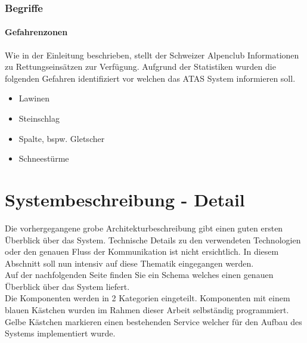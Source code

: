 \documentclass[11pt,english,german]{report}
\theoremstyle{definition}
\begin{document}
\subsection{Begriffe}
\subsubsection{Gefahrenzonen}
Wie in der Einleitung beschrieben, stellt der Schweizer Alpenclub Informationen zu Rettungseinsätzen zur Verfügung. Aufgrund der Statistiken wurden die folgenden Gefahren identifiziert vor welchen das ATAS System informieren soll.
\begin{itemize}
	\item Lawinen
	\item Steinschlag
	\item Spalte, bspw. Gletscher
	\item Schneestürme
\end{itemize}

\newpage
\chapter{Systembeschreibung - Detail}
Die vorhergegangene grobe Architekturbeschreibung gibt einen guten ersten Überblick über das System. Technische Details zu  den verwendeten Technologien oder den genauen Fluss der Kommunikation ist nicht ersichtlich. In diesem Abschnitt soll nun intensiv auf diese Thematik eingegangen werden.\\[0.3cm]
Auf der nachfolgenden Seite finden Sie ein Schema welches einen genauen Überblick über das System liefert.\\[0.3cm]
Die Komponenten werden in 2 Kategorien eingeteilt. Komponenten mit einem blauen Kästchen wurden im Rahmen dieser Arbeit selbständig programmiert. Gelbe Kästchen markieren einen bestehenden Service welcher für den Aufbau des Systems implementiert wurde. 
\end{document}
